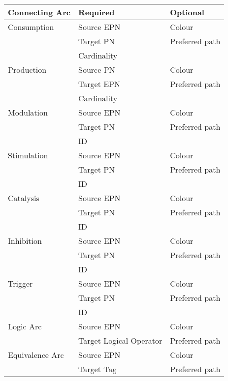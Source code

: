 \documentclass[11pt]{article}
\begin{document}
\begin{table}[H]
   \centering
   \begin{tabular*}{0.95\textwidth}{ l l l   }
      \toprule
      \toprule
      \textbf{Connecting Arc}    		& \textbf{Required} 			&  \textbf{Optional} \\
     \midrule
     \midrule
      Consumption		& Source EPN		& Colour	\\
      					& Target PN		& Preferred path \\
      				      	& Cardinality 		&  \\
     \midrule
      Production			& Source PN		& Colour	\\
      					& Target EPN		& Preferred path \\
      				      	& Cardinality 		&  \\
     \midrule
      Modulation			& Source EPN		& Colour	\\
      					& Target PN		& Preferred path \\
					& ID				& \\
     \midrule
      Stimulation			& Source EPN		& Colour	\\
      					& Target PN		& Preferred path \\
					& ID				& \\
     \midrule
      Catalysis			& Source EPN		& Colour	\\
      					& Target PN		& Preferred path \\
					& ID				& \\
     \midrule
      Inhibition			& Source EPN		& Colour	\\
      					& Target PN		& Preferred path \\
					& ID				& \\
     \midrule
      Trigger			& Source EPN		& Colour	\\
      					& Target PN		& Preferred path \\
					& ID				& \\
     \midrule
      Logic Arc			& Source EPN		& Colour	\\
      					& Target Logical Operator		& Preferred path \\
     \midrule
      Equivalence Arc		& Source EPN		& Colour	\\
      					& Target Tag		& Preferred path \\
    \bottomrule
   \end{tabular*}
   \label{tab:connarc_specs}
\end{table}
\end{document}

